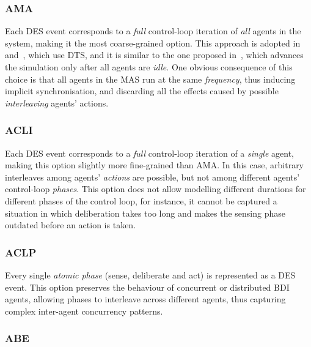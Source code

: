\subsubsection{\acf{AMA}}\label{subsubsec:simulation:ama}

Each \ac{DES} event corresponds to a \emph{full} control-loop iteration of \emph{all} agents in the system,
making it the most coarse-grained option.
%
This approach is adopted in~\cite{HubnerB09} and~\cite{caballero2011eaai},
which use \ac{DTS},
and it is similar to the one proposed in~\cite{singh_integrating_2016},
which advances the simulation only after all agents
are \emph{idle}.
%
One obvious consequence of this choice is that
all agents in the \ac{MAS} run at the same \emph{frequency},
thus inducing implicit synchronisation,
and discarding all the effects caused by possible
\emph{interleaving} agents' actions.

\subsubsection{\acf{ACLI}}\label{subsubsec:simulation:acli}

Each \ac{DES} event corresponds to a \emph{full} control-loop iteration of a \emph{single} agent,
making this option slightly more fine-grained than \ac{AMA}.
%
In this case,
arbitrary interleaves among agents' \emph{actions} are possible,
but not among different agents' control-loop \emph{phases}.
%
This option does not allow modelling different durations for different phases of the control loop,
for instance,
it cannot be captured a situation in which
deliberation takes too long and makes the sensing phase outdated before an action is taken.

\subsubsection{\acf{ACLP}}\label{subsubsec:simulation:aclp}

Every single \emph{atomic phase}
(sense, deliberate and act)
is represented as a \ac{DES} event.
%
This option preserves the behaviour of concurrent or distributed \ac{BDI} agents,
allowing phases to interleave across different agents,
thus capturing complex inter-agent concurrency patterns.

\subsubsection{\ac{ABE}}\label{subsubsec:simulation:abe}


